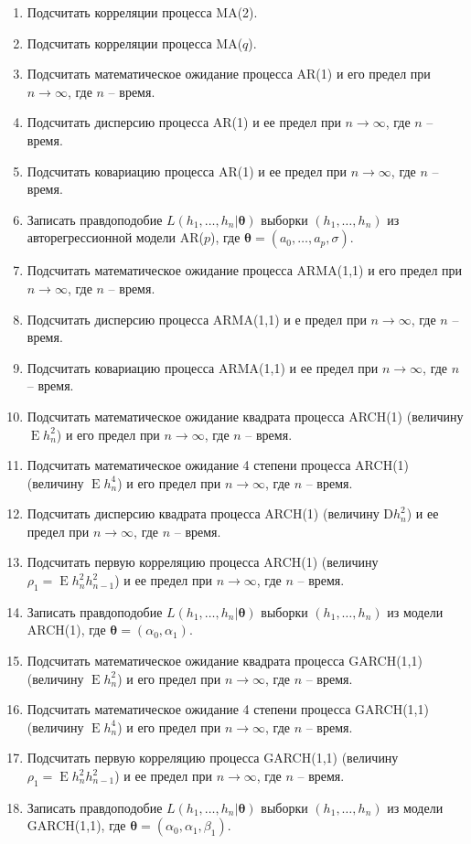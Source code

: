 \documentclass[a4paper,12pt]{extreport}
\renewcommand{\=}[1]{\stackrel{#1}{=}} %
\newcommand{\Expect}{\mathop{{}\mathrm{E}}}
\begin{document}
\begin{enumerate}
	\item Подсчитать корреляции процесса MA(2). 
	\item Подсчитать корреляции процесса MA($q$). 

	\item Подсчитать математическое ожидание процесса AR(1) и его предел при $n \to \infty$,
	где $n$ -- время. 
	\item Подсчитать дисперсию процесса AR(1) и ее предел при $n \to \infty$,
	где $n$ -- время. 
	\item Подсчитать ковариацию процесса AR(1) и ее предел при $n \to \infty$,
	где $n$ -- время.

	\item Записать правдоподобие $L(h_1, \ldots, h_n | \bm{\theta})$
	выборки $(h_1, \ldots, h_n)$ из
	авторегрессионной модели AR($p$), где $\bm{\theta} = (a_0, \ldots, a_p, \sigma)$.

	\item Подсчитать математическое ожидание процесса ARMA(1,1) и его предел при $n \to \infty$,
	где $n$ -- время. 
	\item Подсчитать дисперсию процесса ARMA(1,1) и е предел при $n \to \infty$,
	где $n$ -- время. 
	\item Подсчитать ковариацию процесса ARMA(1,1) и ее предел при $n \to \infty$,
	где $n$ -- время.

	\item Подсчитать математическое ожидание квадрата процесса ARCH(1)
	(величину $\Expect h^2_n$)
	и его предел при $n \to \infty$, где $n$ -- время. 
	\item Подсчитать математическое ожидание 4 степени процесса ARCH(1)
	(величину $\Expect h^4_n$)
	и его предел при $n \to \infty$, где $n$ -- время. 
	\item Подсчитать дисперсию квадрата процесса ARCH(1)
	(величину $\mathrm{D} h^2_n$)
	и ее предел при $n \to \infty$, где $n$ -- время. 
	\item Подсчитать первую корреляцию процесса ARCH(1)
	(величину $\rho_1 = \Expect h^2_n h^2_{n - 1}$)
	и ее предел при $n \to \infty$, где $n$ -- время. 
	\item Записать правдоподобие $L(h_1, \ldots, h_n | \bm{\theta})$
	выборки $(h_1, \ldots, h_n)$ из
	модели ARCH(1), где $\bm{\theta} = (\alpha_0, \alpha_1)$.

	\item Подсчитать математическое ожидание квадрата процесса GARCH(1,1)
	(величину $\Expect h^2_n$)
	и его предел при $n \to \infty$, где $n$ -- время. 
	\item Подсчитать математическое ожидание 4 степени процесса GARCH(1,1)
	(величину $\Expect h^4_n$)
	и его предел при $n \to \infty$, где $n$ -- время. 
	\item Подсчитать первую корреляцию процесса GARCH(1,1)
	(величину $\rho_1 = \Expect h^2_n h^2_{n - 1}$)
	и ее предел при $n \to \infty$, где $n$ -- время. 
	\item Записать правдоподобие $L(h_1, \ldots, h_n | \bm{\theta})$
	выборки $(h_1, \ldots, h_n)$ из
	модели GARCH(1,1), где $\bm{\theta} = (\alpha_0, \alpha_1, \beta_1)$.


\end{enumerate}
\end{document}
